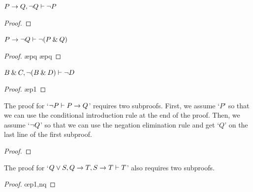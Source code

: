 \begin{earg}

\item $P \rightarrow Q, {\neg} Q \vdash {\neg} P$

\begin{proof}
	 \pr{}
	 \pr{}	
	\open
		 \as{}
		 
		 
	\close
	 
\end{proof}
\medskip


\item $P \rightarrow {\neg} Q \vdash {\neg}(P \mathbin{\&} Q)$

\begin{proof}
	 \pr{}	
	\open
		 \as{}
		 \ae{pq}
		 
		 \ae{pq}
	\close
	 
\end{proof}
\medskip

\begin{minipage}{10cm}
\item $B \mathbin{\&} C, {\neg}(B \mathbin{\&} D) \vdash {\neg} D$

\begin{proof}
	 \pr{}	
	 \pr{}
	\open
		 \as{}
		 \ae{p1}
		 
		 
	\close
	 
\end{proof}
\medskip
\end{minipage}


\item The proof for `${\neg} P \vdash P \rightarrow Q$' requires two subproofs. First, we assume `$P$' so that we can use the conditional introduction rule at the end of the proof. Then, we assume `${\neg} Q$' so that we can use the negation elimination rule and get `$Q$' on the last line of the first subproof.

\begin{proof}
	 \pr{}	
	\open
			\as{}
		\open
			 \as{}
			 
			 
		\close
		 
	\close
	 
\end{proof}
\medskip


\begin{minipage}{10cm}
\item The proof for  `$Q \vee S, Q \rightarrow T, S \rightarrow T \vdash T$' also requires two subproofs. 

\begin{proof}
	 \pr{}
	 \pr{}
	 \pr{}
	\open
		 \as{}
			\open
				 \as{}
				 \oe{p1,nq}
				 
				 
			\close
		 
		 
		 
	\close
	 
\end{proof}
\end{minipage}

\end{earg}



